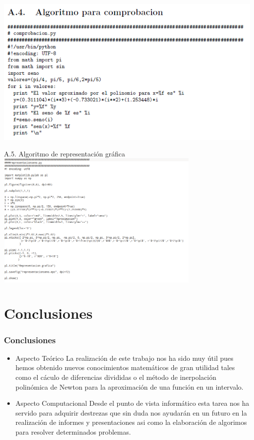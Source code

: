 \documentclass{beamer}
\begin{document}
\begin{frame}
  \includegraphics[width=1.0\textwidth]{img/Algoritmo4}
\end{frame}
\begin{frame}
A.5. Algoritmo de representación gráfica
  \includegraphics[width=0.75\textwidth]{img/Algoritmo5}
\end{frame}
\section{Conclusiones}
\begin{frame}
\frametitle{Conclusiones}
  \begin{itemize}
  \item  Aspecto Teórico
La realización de este trabajo nos ha sido muy útil pues hemos obtenido nuevos conocimientos matemáticos de gran utilidad tales como el cáculo de diferencias divididas o el método de inerpolación polinómica de Newton para la aproximación de una función en un intervalo.
  \item  Aspecto Computacional
Desde el punto de vista informático esta tarea nos ha servido para adquirir destrezas que sin duda nos ayudarán en un futuro en la realización de informes y presentaciones asi como la elaboración de algorimos para resolver determinados problemas.
  \end{itemize}
\end{frame}
\end{document}
